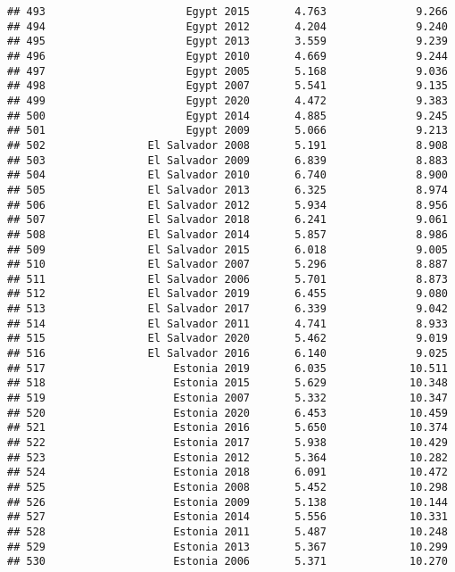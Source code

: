 \documentclass[
]{article}
\begin{document}
\begin{verbatim}
## 493                      Egypt 2015       4.763              9.266
## 494                      Egypt 2012       4.204              9.240
## 495                      Egypt 2013       3.559              9.239
## 496                      Egypt 2010       4.669              9.244
## 497                      Egypt 2005       5.168              9.036
## 498                      Egypt 2007       5.541              9.135
## 499                      Egypt 2020       4.472              9.383
## 500                      Egypt 2014       4.885              9.245
## 501                      Egypt 2009       5.066              9.213
## 502                El Salvador 2008       5.191              8.908
## 503                El Salvador 2009       6.839              8.883
## 504                El Salvador 2010       6.740              8.900
## 505                El Salvador 2013       6.325              8.974
## 506                El Salvador 2012       5.934              8.956
## 507                El Salvador 2018       6.241              9.061
## 508                El Salvador 2014       5.857              8.986
## 509                El Salvador 2015       6.018              9.005
## 510                El Salvador 2007       5.296              8.887
## 511                El Salvador 2006       5.701              8.873
## 512                El Salvador 2019       6.455              9.080
## 513                El Salvador 2017       6.339              9.042
## 514                El Salvador 2011       4.741              8.933
## 515                El Salvador 2020       5.462              9.019
## 516                El Salvador 2016       6.140              9.025
## 517                    Estonia 2019       6.035             10.511
## 518                    Estonia 2015       5.629             10.348
## 519                    Estonia 2007       5.332             10.347
## 520                    Estonia 2020       6.453             10.459
## 521                    Estonia 2016       5.650             10.374
## 522                    Estonia 2017       5.938             10.429
## 523                    Estonia 2012       5.364             10.282
## 524                    Estonia 2018       6.091             10.472
## 525                    Estonia 2008       5.452             10.298
## 526                    Estonia 2009       5.138             10.144
## 527                    Estonia 2014       5.556             10.331
## 528                    Estonia 2011       5.487             10.248
## 529                    Estonia 2013       5.367             10.299
## 530                    Estonia 2006       5.371             10.270

\end{verbatim}
\end{document}
